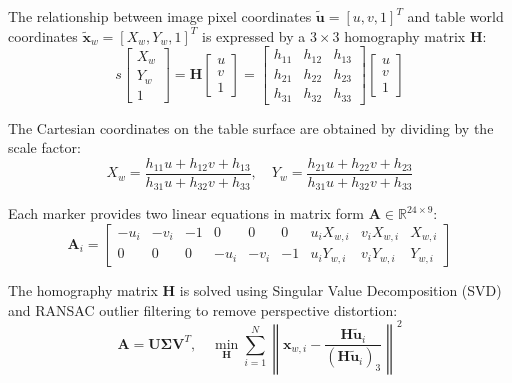 \documentclass{svproc}
\begin{document}
The relationship between image pixel coordinates $\tilde{\mathbf{u}} = [u, v, 1]^T$ and table world coordinates $\tilde{\mathbf{x}}_w = [X_w, Y_w, 1]^T$ is expressed by a $3 \times 3$ homography matrix $\mathbf{H}$:
\begin{equation}
    s \begin{bmatrix} X_w \\ Y_w \\ 1 \end{bmatrix} = \mathbf{H} \begin{bmatrix} u \\ v \\ 1 \end{bmatrix} = \begin{bmatrix} h_{11} & h_{12} & h_{13} \\ h_{21} & h_{22} & h_{23} \\ h_{31} & h_{32} & h_{33} \end{bmatrix} \begin{bmatrix} u \\ v \\ 1 \end{bmatrix}
\end{equation}

The Cartesian coordinates on the table surface are obtained by dividing by the scale factor:
\begin{equation}
    X_w = \frac{h_{11}u + h_{12}v + h_{13}}{h_{31}u + h_{32}v + h_{33}}, \quad Y_w = \frac{h_{21}u + h_{22}v + h_{23}}{h_{31}u + h_{32}v + h_{33}}
\end{equation}

Each marker provides two linear equations in matrix form $\mathbf{A} \in \mathbb{R}^{24 \times 9}$:
\begin{equation}
    \mathbf{A}_i = \begin{bmatrix} -u_i & -v_i & -1 & 0 & 0 & 0 & u_i X_{w,i} & v_i X_{w,i} & X_{w,i} \\ 0 & 0 & 0 & -u_i & -v_i & -1 & u_i Y_{w,i} & v_i Y_{w,i} & Y_{w,i} \end{bmatrix}
\end{equation}

The homography matrix $\mathbf{H}$ is solved using Singular Value Decomposition (SVD) and RANSAC outlier filtering to remove perspective distortion:
\begin{equation}
    \mathbf{A} = \mathbf{U} \mathbf{\Sigma} \mathbf{V}^T, \quad \min_{\mathbf{H}} \sum_{i=1}^N \left\| \mathbf{x}_{w,i} - \frac{\mathbf{H} \tilde{\mathbf{u}}_i}{(\mathbf{H} \tilde{\mathbf{u}}_i)_3} \right\|^2
\end{equation}
\end{document}
